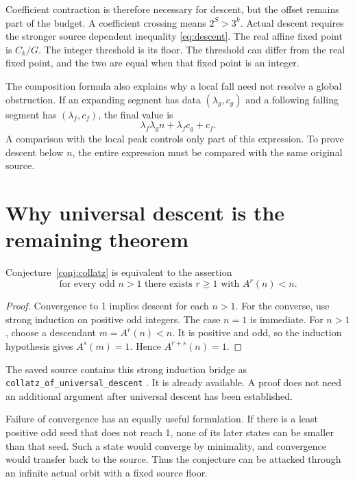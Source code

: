 Coefficient contraction is therefore necessary for descent, but the offset remains part of the budget. A coefficient crossing means $2^S>3^k$. Actual descent requires the stronger source dependent inequality \eqref{eq:descent}. The real affine fixed point is $C_k/G$. The integer threshold is its floor. The threshold can differ from the real fixed point, and the two are equal when that fixed point is an integer.

The composition formula also explains why a local fall need not resolve a global obstruction. If an expanding segment has data $(\lambda_g,c_g)$ and a following falling segment has $(\lambda_f,c_f)$, the final value is
\[
\lambda_f\lambda_g n+\lambda_f c_g+c_f.
\]
A comparison with the local peak controls only part of this expression. To prove descent below $n$, the entire expression must be compared with the same original source.

\section{Why universal descent is the remaining theorem}
\begin{theorem}\label{thm:induction}
Conjecture~\ref{conj:collatz} is equivalent to the assertion
\begin{equation}\label{eq:universal}
\text{for every odd }n>1\text{ there exists }r\ge1\text{ with }A^r(n)<n.
\end{equation}
\end{theorem}
\begin{proof}
Convergence to 1 implies descent for each $n>1$. For the converse, use strong induction on positive odd integers. The case $n=1$ is immediate. For $n>1$, choose a descendant $m=A^r(n)<n$. It is positive and odd, so the induction hypothesis gives $A^s(m)=1$. Hence $A^{r+s}(n)=1$.
\end{proof}

The saved source contains this strong induction bridge as \texttt{collatz\_of\_universal\_descent} \cite{projectcollatzcore}. It is already available. A proof does not need an additional argument after universal descent has been established.

Failure of convergence has an equally useful formulation. If there is a least positive odd seed that does not reach 1, none of its later states can be smaller than that seed. Such a state would converge by minimality, and convergence would transfer back to the source. Thus the conjecture can be attacked through an infinite actual orbit with a fixed source floor.

